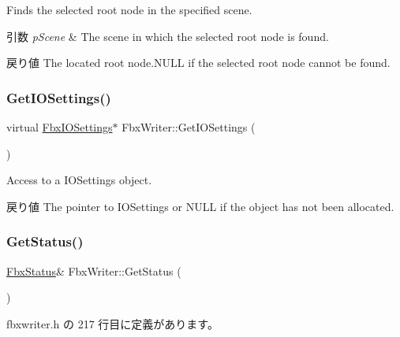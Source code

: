 Finds the selected root node in the specified scene. 
\begin{DoxyParams}{引数}
{\em p\+Scene} & The scene in which the selected root node is found. \\
\hline
\end{DoxyParams}
\begin{DoxyReturn}{戻り値}
The located root node.{\ttfamily N\+U\+LL} if the selected root node cannot be found. 
\end{DoxyReturn}
\mbox{\label{class_fbx_writer_abc22ed1c0a22f00d850fb83a4572bf16}} 
\subsubsection{\texorpdfstring{Get\+I\+O\+Settings()}{GetIOSettings()}}
{\footnotesize\ttfamily virtual \hyperlink{class_fbx_i_o_settings}{Fbx\+I\+O\+Settings}$\ast$ Fbx\+Writer\+::\+Get\+I\+O\+Settings (\begin{DoxyParamCaption}{ }\end{DoxyParamCaption})\hspace{0.3cm}{\ttfamily [virtual]}}

Access to a I\+O\+Settings object. \begin{DoxyReturn}{戻り値}
The pointer to I\+O\+Settings or {\ttfamily N\+U\+LL} {\ttfamily if} the object has not been allocated. 
\end{DoxyReturn}
\mbox{\label{class_fbx_writer_a688d905ebbebe4536f31c87b55edf67b}} 
\subsubsection{\texorpdfstring{Get\+Status()}{GetStatus()}}
{\footnotesize\ttfamily \hyperlink{class_fbx_status}{Fbx\+Status}\& Fbx\+Writer\+::\+Get\+Status (\begin{DoxyParamCaption}{ }\end{DoxyParamCaption})\hspace{0.3cm}{\ttfamily [inline]}}



 fbxwriter.\+h の 217 行目に定義があります。

